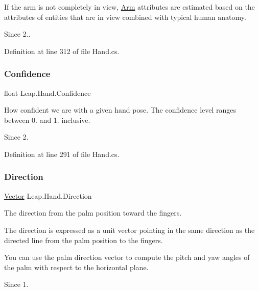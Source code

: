 If the arm is not completely in view, \mbox{\hyperlink{class_leap_1_1_arm}{Arm}} attributes are estimated based on the attributes of entities that are in view combined with typical human anatomy. \begin{DoxySince}{Since}
2.. 
\end{DoxySince}


Definition at line 312 of file Hand.\+cs.

\mbox{\label{class_leap_1_1_hand_ac7f4665971a0f1d192d9dcc0f7ef1d01}} 
\subsubsection{\texorpdfstring{Confidence}{Confidence}}
{\footnotesize\ttfamily float Leap.\+Hand.\+Confidence}



How confident we are with a given hand pose. The confidence level ranges between 0. and 1. inclusive. 

\begin{DoxySince}{Since}
2. 
\end{DoxySince}


Definition at line 291 of file Hand.\+cs.

\mbox{\label{class_leap_1_1_hand_a1b743a48862aac8d04be2bb54588f3bf}} 
\subsubsection{\texorpdfstring{Direction}{Direction}}
{\footnotesize\ttfamily \mbox{\hyperlink{struct_leap_1_1_vector}{Vector}} Leap.\+Hand.\+Direction}



The direction from the palm position toward the fingers. 

The direction is expressed as a unit vector pointing in the same direction as the directed line from the palm position to the fingers.

You can use the palm direction vector to compute the pitch and yaw angles of the palm with respect to the horizontal plane. \begin{DoxySince}{Since}
1. 
\end{DoxySince}


